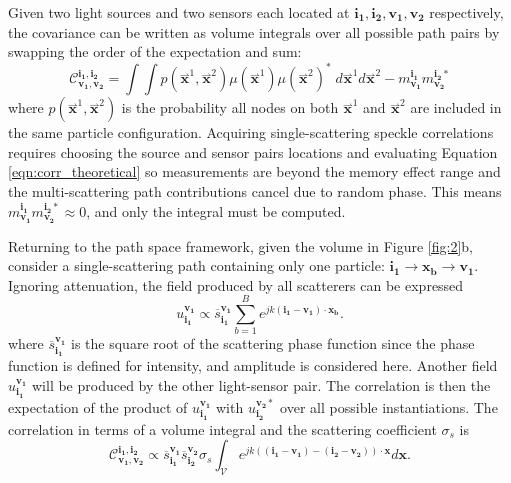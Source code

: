 Given two light sources and two sensors each located at $\mathbf{i_1}, \mathbf{i_2}, \mathbf{v_1}, \mathbf{v_2}$ respectively, the covariance can be written as volume integrals over all possible path pairs by swapping the order of the expectation and sum:
%
\begin{equation}
    \mathcal{C}_{\mathbf{v_1},\mathbf{v_2}}^{\mathbf{i_1},\mathbf{i_2}} = \int \int p(\overset{\rightharpoonup}{\mathbf{x}}^1,\overset{\rightharpoonup}{\mathbf{x}}^2) \mu(\overset{\rightharpoonup}{\mathbf{x}}^1) \mu(\overset{\rightharpoonup}{\mathbf{x}}^2)^* \; d\overset{\rightharpoonup}{\mathbf{x}}^1 d\overset{\rightharpoonup}{\mathbf{x}}^2 - m_{\mathbf{v_1}}^{\mathbf{i_1}} m_{\mathbf{v_2}}^{\mathbf{i_2}*}
    \label{eqn:corr_theoretical}
\end{equation}
%
where $p(\overset{\rightharpoonup}{\mathbf{x}}^1,\overset{\rightharpoonup}{\mathbf{x}}^2)$ is the probability all nodes on both $\overset{\rightharpoonup}{\mathbf{x}}^1$ and $\overset{\rightharpoonup}{\mathbf{x}}^2$ are included in the same particle configuration. Acquiring single-scattering speckle correlations requires choosing the source and sensor pairs locations and evaluating Equation \ref{eqn:corr_theoretical} so measurements are beyond the memory effect range and the multi-scattering path contributions cancel due to random phase. This means $m_{\mathbf{v_1}}^{\mathbf{i_1}} m_{\mathbf{v_2}}^{\mathbf{i_2}*} \approx 0$, and only the integral must be computed.

Returning to the path space framework, given the volume in Figure \ref{fig:2}b, consider a single-scattering path containing only one particle: $\mathbf{i_1} \rightarrow \mathbf{x_b} \rightarrow \mathbf{v_1}$. Ignoring attenuation, the field produced by all scatterers can be expressed
%
\begin{equation}
    u_{\mathbf{i_1}}^{\mathbf{v_1}} \propto \overline{s}_{\mathbf{i_1}}^{\mathbf{v_1}} \sum_{b=1}^B e^{jk(\mathbf{i_1} - \mathbf{v_1}) \cdot \mathbf{x_b}}.
\end{equation}
%
where $\overline{s}_{\mathbf{i_1}}^{\mathbf{v_1}}$ is the square root of the scattering phase function since the phase function is defined for intensity, and amplitude is considered here. Another field $u_{\mathbf{i_1}}^{\mathbf{v_1}}$ will be produced by the other light-sensor pair. The correlation is then the expectation of the product of $u_{\mathbf{i_1}}^{\mathbf{v_1}}$ with $u_{\mathbf{i_2}}^{\mathbf{v_2}*}$ over all possible instantiations. The correlation in terms of a volume integral and the scattering coefficient $\sigma_s$ is
%
\begin{equation}
    \mathcal{C}_{\mathbf{v_1},\mathbf{v_2}}^{\mathbf{i_1},\mathbf{i_2}} \propto \overline{s}_{\mathbf{i_1}}^{\mathbf{v_1}} \overline{s}_{\mathbf{i_2}}^{\mathbf{v_2}} \sigma_s \int_\mathcal{V} e^{jk((\mathbf{i_1} - \mathbf{v_1}) - (\mathbf{i_2} - \mathbf{v_2})) \cdot \mathbf{x}} d \mathbf{x}.
\end{equation}

